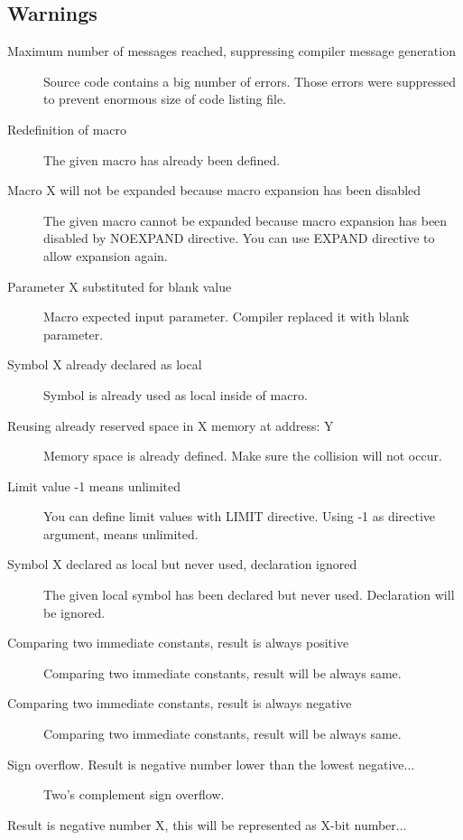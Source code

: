     \subsection{Warnings}
        \begin{description}
            \item[Maximum number of messages reached, suppressing compiler message generation]
                Source code contains a big number of errors. Those errors were suppressed to prevent enormous size of code listing file.
            \item[Redefinition of macro ]
                The given macro has already been defined.
            \item[Macro X will not be expanded because macro expansion has been disabled]
                The given macro cannot be expanded because macro expansion has been disabled by NOEXPAND directive. You can use EXPAND directive to allow expansion again.
            \item[Parameter X substituted for blank value ]
                Macro expected input parameter. Compiler replaced it with blank parameter.
            \item[Symbol X already declared as local ]
                Symbol is already used as local inside of macro.
            \item[Reusing already reserved space in X memory at address: Y]
                Memory space is already defined. Make sure the collision will not occur.
            \item[Limit value -1 means unlimited]
                You can define limit values with LIMIT directive. Using -1 as directive argument, means unlimited.
            \item[Symbol X declared as local but never used, declaration ignored]
                The given local symbol has been declared but never used. Declaration will be ignored.
            \item[Comparing two immediate constants, result is always positive]
                Comparing two immediate constants, result will be always same.
            \item[Comparing two immediate constants, result is always negative]
                Comparing two immediate constants, result will be always same.
            \item[Sign overflow. Result is negative number lower than the lowest negative...]
                Two's complement sign overflow.
            \item[Result is negative number X, this will be represented as X-bit number...]

\end{description}
